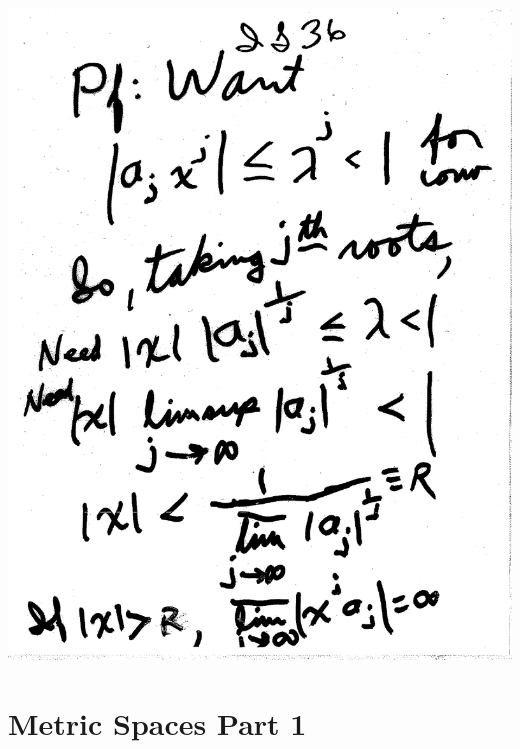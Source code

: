 \documentclass[10pt,a4paper]{article}
\begin{document}
{{\includegraphics[scale=.42]{Pages/IS_36}
 
\newpage
\section{Metric Spaces Part 1}

}}
\end{document}
